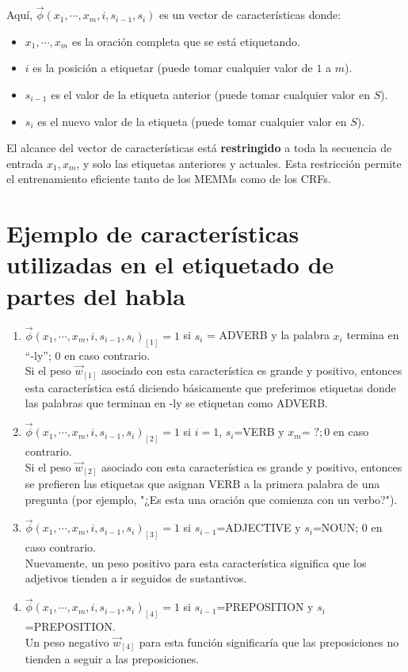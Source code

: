 Aquí, $\vec{\phi}(x_1, \cdots, x_m, i, s_{i-1},s_i)$ es un vector de características donde:
\begin{itemize}
\item $x_1, \cdots, x_m$ es la oración completa que se está etiquetando.
\item $i$ es la posición a etiquetar (puede tomar cualquier valor de $1$ a $m$).
\item $s_{i-1}$ es el valor de la etiqueta anterior (puede tomar cualquier valor en $S$).
\item $s_i$ es el nuevo valor de la etiqueta (puede tomar cualquier valor en $S$).

\end{itemize}

El alcance del vector de características está \textbf{restringido} a toda la secuencia de entrada $x_1, x_m$, y solo las etiquetas anteriores y actuales. Esta restricción permite el entrenamiento eficiente tanto de los MEMMs como de los CRFs.


\section{Ejemplo de características utilizadas en el etiquetado de partes del habla}

\begin{enumerate}
\item $\vec{\phi}(x_1, \cdots, x_m, i, s_{i-1},s_i)_{[1]}=1$ si $s_i$ = ADVERB y la palabra $x_i$ termina en ``-ly''; 0 en caso contrario. \\
Si el peso $\vec{w}_{[1]}$ asociado con esta característica es grande y positivo, entonces esta característica está diciendo básicamente que preferimos etiquetas donde las palabras que terminan en -ly se etiquetan como ADVERB.

\item $\vec{\phi}(x_1, \cdots, x_m, i, s_{i-1},s_i)_{[2]}=1$ si $i=1$, $s_i$=VERB y $x_m$= $?; 0$ en caso contrario. \\
Si el peso $\vec{w}_{[2]}$ asociado con esta característica es grande y positivo, entonces se prefieren las etiquetas que asignan VERB a la primera palabra de una pregunta (por ejemplo, "¿Es esta una oración que comienza con un verbo?").

\item $\vec{\phi}(x_1, \cdots, x_m, i, s_{i-1},s_i)_{[3]}=1$ si $s_{i-1}$=ADJECTIVE y $s_i$=NOUN; 0 en caso contrario. \\
Nuevamente, un peso positivo para esta característica significa que los adjetivos tienden a ir seguidos de sustantivos.

\item $\vec{\phi}(x_1, \cdots, x_m, i, s_{i-1},s_i)_{[4]}=1$ si $s_{i-1}$=PREPOSITION y $s_{i}$=PREPOSITION. \\
Un peso negativo $\vec{w}_{[4]}$ para esta función significaría que las preposiciones no tienden a seguir a las preposiciones.

\end{enumerate}

